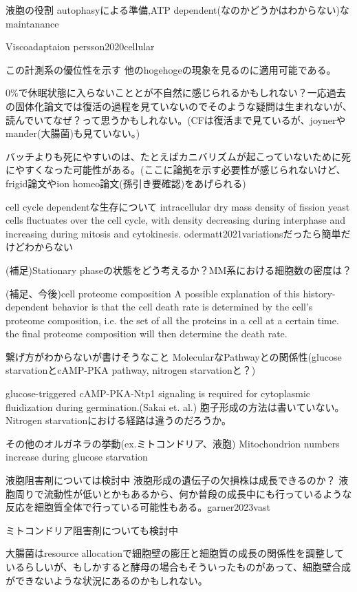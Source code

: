 液胞の役割
autophasyによる準備,ATP dependent(なのかどうかはわからない)なmaintanance

Viscoadaptaion
persson2020cellular

この計測系の優位性を示す
他のhogehogeの現象を見るのに適用可能である。

0\%で休眠状態に入らないこととが不自然に感じられるかもしれない？一応過去の固体化論文では復活の過程を見ていないのでそのような疑問は生まれないが、読んでいてなぜ？って思うかもしれない。(CFは復活まで見ているが、joynerやmander(大腸菌)も見ていない。)

バッチよりも死にやすいのは、たとえばカニバリズムが起こっていないために死にやすくなった可能性がある。(ここに論拠を示す必要性が感じられないけど、frigid論文やion homeo論文(孫引き要確認)をあげられる)

cell cycle dependentな生存について
intracellular dry mass density of fission yeast cells fluctuates over the cell cycle, with density decreasing during interphase and increasing during mitosis and cytokinesis. odermatt2021variationsだったら簡単だけどわからない

(補足)Stationary phaseの状態をどう考えるか？MM系における細胞数の密度は？

(補足、今後)cell proteome composition
A possible explanation of this history-dependent behavior is that the cell death rate is determined by the cell’s proteome composition, i.e. the set of all the proteins in a cell at a certain time.
the final proteome composition will then determine the death rate.



繋げ方がわからないが書けそうなこと
MolecularなPathwayとの関係性(glucose starvationとcAMP-PKA pathway, nitrogen starvationと？)

glucose-triggered cAMP-PKA-Ntp1 signaling is required for cytoplasmic fluidization during germination.(Sakai et. al.)
胞子形成の方法は書いていない。Nitrogen starvationにおける経路は違うのだろうか。


その他のオルガネラの挙動(ex.ミトコンドリア、液胞)
Mitochondrion numbers increase during glucose starvation

液胞阻害剤については検討中
液胞形成の遺伝子の欠損株は成長できるのか？
液胞周りで流動性が低いとかもあるから、何か普段の成長中にも行っているような反応を細胞質全体で行っている可能性もある。garner2023vast

ミトコンドリア阻害剤についても検討中

大腸菌はresource allocationで細胞壁の膨圧と細胞質の成長の関係性を調整しているらしいが、もしかすると酵母の場合もそういったものがあって、細胞壁合成ができないような状況にあるのかもしれない。


